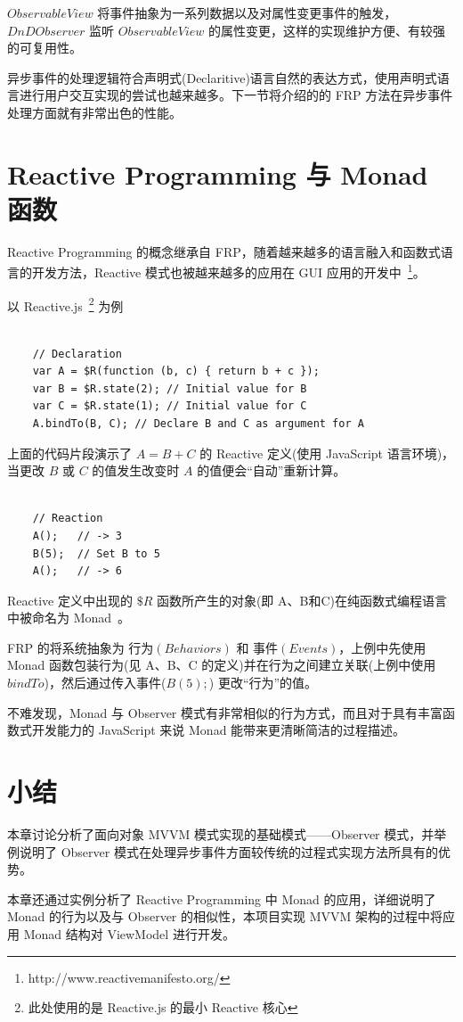 $ObservableView$ 将事件抽象为一系列数据以及对属性变更事件的触发，$DnDObserver$ 监听 $ObservableView$ 的属性变更，这样的实现维护方便、有较强的可复用性。

异步事件的处理逻辑符合声明式(Declaritive)语言自然的表达方式，使用声明式语言进行用户交互实现的尝试也越来越多。下一节将介绍的的 FRP 方法在异步事件处理方面就有非常出色的性能。

\section{Reactive Programming 与 Monad 函数}

Reactive Programming 的概念继承自 FRP，随着越来越多的语言融入和函数式语言的开发方法，Reactive 模式也被越来越多的应用在 GUI 应用的开发中~\footnote{http://www.reactivemanifesto.org/}。

以 Reactive.js~\footnote{此处使用的是 Reactive.js 的最小 Reactive 核心} 为例~\cite{Carkci2013}

\begin{verbatim}

    // Declaration
    var A = $R(function (b, c) { return b + c });
    var B = $R.state(2); // Initial value for B
    var C = $R.state(1); // Initial value for C
    A.bindTo(B, C); // Declare B and C as argument for A

\end{verbatim}

上面的代码片段演示了 $A = B + C$ 的 Reactive 定义(使用 JavaScript 语言环境)，当更改 $B$ 或 $C$ 的值发生改变时 $A$ 的值便会“自动”重新计算。

\begin{verbatim}

    // Reaction
    A();   // -> 3
    B(5);  // Set B to 5
    A();   // -> 6

\end{verbatim}

Reactive 定义中出现的 $\$R$ 函数所产生的对象(即 A、B和C)在纯函数式编程语言中被命名为 Monad~\cite{raey}。

FRP 的将系统抽象为 $行为(Behaviors)$ 和 $事件(Events)$，上例中先使用 Monad 函数包装行为(见 A、B、C 的定义)并在行为之间建立关联(上例中使用 $bindTo$)，然后通过传入事件($B(5);$) 更改“行为”的值。

不难发现，Monad 与 Observer 模式有非常相似的行为方式，而且对于具有丰富函数式开发能力的 JavaScript 来说 Monad 能带来更清晰简洁的过程描述。

\section{小结}

本章讨论分析了面向对象 MVVM 模式实现的基础模式——Observer 模式，并举例说明了 Observer 模式在处理异步事件方面较传统的过程式实现方法所具有的优势。

本章还通过实例分析了 Reactive Programming 中 Monad 的应用，详细说明了 Monad 的行为以及与 Observer 的相似性，本项目实现 MVVM 架构的过程中将应用 Monad 结构对 ViewModel 进行开发。

